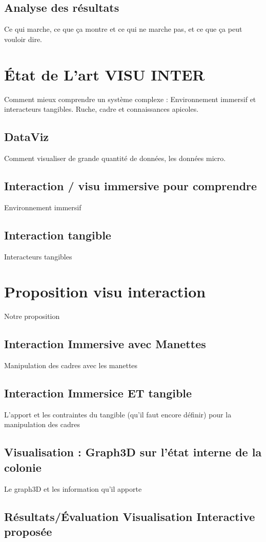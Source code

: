 \documentclass[10pt,a4paper]{article}
\begin{document}
	\subsection{Analyse des résultats}
		Ce qui marche, ce que ça montre et ce qui ne marche pas, et ce que ça peut vouloir dire.
		
			
\section{État de L'art VISU INTER}
	Comment mieux comprendre un système complexe : Environnement immersif et interacteurs tangibles. Ruche, cadre et connaissances apicoles.
	\subsection{DataViz}
		Comment visualiser de grande quantité de données, les données micro.
	\subsection{Interaction / visu immersive pour comprendre}
		Environnement immersif
	\subsection{Interaction tangible}
		Interacteurs tangibles
\section{Proposition visu interaction}
	Notre proposition
	\subsection{Interaction Immersive avec Manettes}
		Manipulation des cadres avec les manettes
	\subsection{Interaction Immersice ET tangible}
		L'apport et les contraintes du tangible (qu'il faut encore définir) pour la manipulation des cadres
	\subsection{Visualisation : Graph3D sur l'état interne de la colonie}
		Le graph3D et les information qu'il apporte
	\subsection{Résultats/Évaluation Visualisation Interactive proposée}
\end{document}
